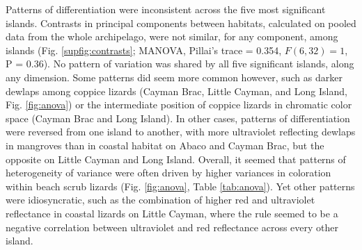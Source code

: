 
Patterns of differentiation were inconsistent across the five most significant islands. Contrasts in principal components between habitats, calculated on pooled data from the whole archipelago, were not similar, for any component, among islands (Fig. \ref{supfig:contrasts}; MANOVA, Pillai's trace = 0.354, $F(6, 32) = 1$, P = 0.36). No pattern of variation was shared by all five significant islands, along any dimension. Some patterns did seem more common however, such as darker dewlaps among coppice lizards (Cayman Brac, Little Cayman, and Long Island, Fig. \ref{fig:anova}) or the intermediate position of coppice lizards in chromatic color space (Cayman Brac and Long Island). In other cases, patterns of differentiation were reversed from one island to another, with more ultraviolet reflecting dewlaps in mangroves than in coastal habitat on Abaco and Cayman Brac, but the opposite on Little Cayman and Long Island. Overall, it seemed that patterns of heterogeneity of variance were often driven by higher variances in coloration within beach scrub lizards (Fig. \ref{fig:anova}, Table \ref{tab:anova}). Yet other patterns were idiosyncratic, such as the combination of higher red and ultraviolet reflectance in coastal lizards on Little Cayman, where the rule seemed to be a negative correlation between ultraviolet and red reflectance across every other island.\\